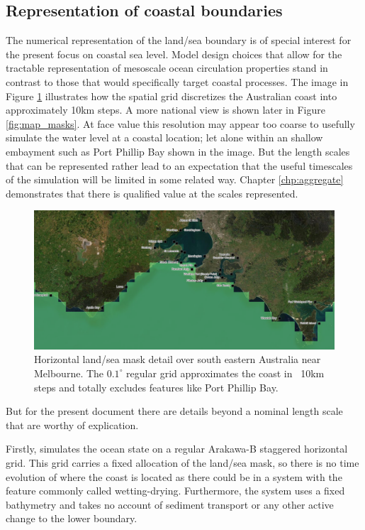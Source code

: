 \subsection{Representation of coastal boundaries}
The numerical representation of the land/sea boundary is of special interest for the present focus on coastal sea level.
Model design choices that allow for the tractable representation of mesoscale ocean circulation properties stand in contrast to those that would specifically target coastal processes.
The image in Figure \ref{fig:oceanmapsMaskDetail} illustrates how the \BL{} spatial grid discretizes the Australian coast into approximately 10km steps.  A more national view is shown later in Figure \ref{fig:map_masks}.
At face value this resolution may appear too coarse to usefully simulate the water level at a coastal location; let alone within an shallow embayment such as Port Phillip Bay shown in the image.    But the length scales that can be represented rather lead to an expectation that the useful timescales of the simulation will be limited in some related way.   Chapter \ref{chp:aggregate} demonstrates that there is qualified value at the scales represented.
\begin{figure}[H]
    \begin{center}
    \includegraphics[width=\figwidthBig]{figures/images/oceanmapsMaskVic.png}
    \caption{Horizontal land/sea mask detail over south eastern Australia near Melbourne. The $0.1^{\circ}$ regular grid approximates the coast in ~10km steps and totally excludes features like Port Phillip Bay.}
    \end{center}
    \label{fig:oceanmapsMaskDetail}
\end{figure}
But for the present document there are details beyond a nominal length scale that are worthy of explication.

Firstly, \BL{} simulates the ocean state on a regular Arakawa-B staggered horizontal grid.
This grid carries a fixed allocation of the land/sea mask, so there is no time evolution of where the coast is located as there could be in a system with the feature commonly called wetting-drying.
Furthermore, the system uses a fixed bathymetry and takes no account of sediment transport or any other active change to the lower boundary.

